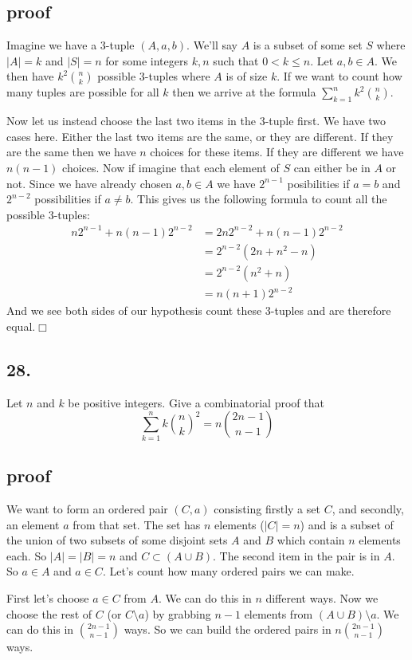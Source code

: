 \documentclass{article}
\begin{document}
\subsection*{proof}
Imagine we have a 3-tuple $(A,a,b)$. We'll say $A$ is a subset of some set $S$ where $\lvert A\rvert=k$ and $\lvert S\rvert=n$ for some integers $k,n$ such that $0<k\le n$. Let $a,b\in A$. We then have $k^2\binom{n}{k}$ possible 3-tuples where $A$ is of size $k$. If we want to count how many tuples are possible for all $k$ then we arrive at the formula $\sum\limits_{k=1}^n{k^2\binom{n}{k}}$.

Now let us instead choose the last two items in the 3-tuple first. We have two cases here. Either the last two items are the same, or they are different. If they are the same then we have $n$ choices for these items. If they are different we have $n(n-1)$ choices. Now if imagine that each element of $S$ can either be in $A$ or not. Since we have already chosen $a,b\in A$ we have $2^{n-1}$ posibilities if $a=b$ and $2^{n-2}$ possibilities if $a\ne b$. This gives us the following formula to count all the possible 3-tuples:
\begin{align*}
  n2^{n-1}+n(n-1)2^{n-2}&=2n2^{n-2}+n(n-1)2^{n-2}\\
  &=2^{n-2}(2n+n^2-n)\\
  &=2^{n-2}(n^2+n)\\
  &=n(n+1)2^{n-2}
\end{align*}
And we see both sides of our hypothesis count these 3-tuples and are therefore equal.$\Box$
\subsection*{28.}
Let $n$ and $k$ be positive integers. Give a combinatorial proof that
\[\sum\limits_{k=1}^n{k\binom{n}{k}^2}=n\binom{2n-1}{n-1}\]
\subsection*{proof}
We want to form an ordered pair $(C,a)$ consisting firstly a set $C$, and secondly, an element $a$ from that set. The set has $n$ elements ($\lvert C\rvert=n$) and is a subset of the union of two subsets of some disjoint sets $A$ and $B$ which contain $n$ elements each. So $\lvert A\rvert=\lvert B\rvert=n$ and $C\subset(A\cup B)$. The second item in the pair is in $A$. So $a\in A$ and $a\in C$. Let's count how many ordered pairs we can make.

First let's choose $a\in C$ from $A$. We can do this in $n$ different ways. Now we choose the rest of $C$ (or $C\setminus a$) by grabbing $n-1$ elements from $(A\cup B)\setminus a$. We can do this in $\binom{2n-1}{n-1}$ ways. So we can build the ordered pairs in $n\binom{2n-1}{n-1}$ ways.
\end{document}
